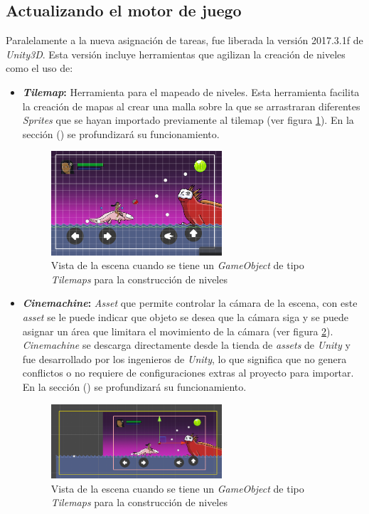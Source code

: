 \subsection{Actualizando el motor de juego}
Paralelamente a la nueva asignación de tareas, fue liberada la versión 
2017.3.1f de \textit{Unity3D}. Esta versión incluye herramientas que agilizan la 
creación de niveles como el uso de: 
	\begin{itemize}
		\item \textbf{\textit{Tilemap}:} Herramienta para el mapeado de niveles. Esta 
		herramienta facilita la creación de mapas al crear una malla sobre la que 
		se arrastraran diferentes \textit{Sprites} que se hayan importado previamente 
		al tilemap (ver figura \ref{fig:TilemapPantalla}). En la sección () se 
		profundizará su funcionamiento.
		
		\begin{figure}[h]
    			\centering
    			\includegraphics[width=0.6\textwidth]{02Antecedentes/Imagenes/tilemaps01.png}
    			\caption{Vista de la escena cuando se tiene un \textit{GameObject} de 
    			tipo \textit{Tilemaps} para la construcción de niveles}
    			\label{fig:TilemapPantalla}
		\end{figure}
		
		\item \textbf{\textit{Cinemachine}:} \textit{Asset} que permite controlar la 
		cámara de la escena, con este \textit{asset} se le puede indicar que objeto se 
		desea que la cámara siga y se puede asignar un área que limitara el movimiento 
		de la cámara (ver figura \ref{fig:CinemaPantalla}). \textit{Cinemachine} se 
		descarga directamente desde la tienda de \textit{assets} de \textit{Unity} y 
		fue desarrollado por los ingenieros de \textit{Unity}, lo que significa que 
		no genera conflictos o no requiere de configuraciones extras al proyecto para 
		importar. En la sección () se profundizará su funcionamiento.
			
			\begin{figure}[h]
    			\centering
    			\includegraphics[width=0.6\textwidth]{02Antecedentes/Imagenes/cinemachine01.png}
    			\caption{Vista de la escena cuando se tiene un \textit{GameObject} de 
    			tipo \textit{Tilemaps} para la construcción de niveles}
    			\label{fig:CinemaPantalla}
			\end{figure}


\end{itemize}
